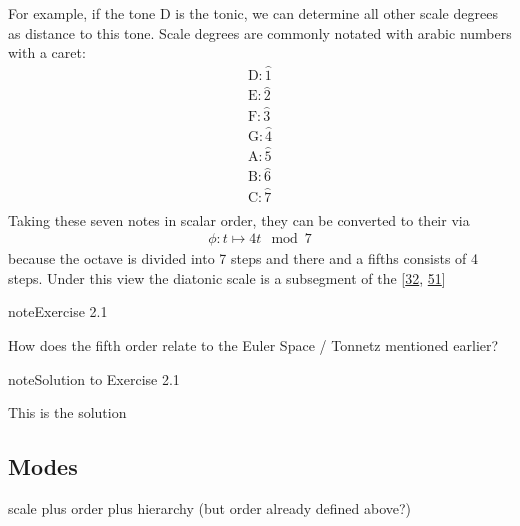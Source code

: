 \documentclass[letterpaper,10pt,english]{sphinxmanual}
\begin{document}
\sphinxAtStartPar
For example, if the tone D is the tonic, we can determine all other scale degrees
as distance to this tone. Scale degrees are commonly notated with arabic numbers with a caret:
\begin{equation*}
\begin{split}\text{D}: \hat{1}\\
\text{E}: \hat{2}\\
\text{F}: \hat{3}\\
\text{G}: \hat{4}\\
\text{A}: \hat{5}\\
\text{B}: \hat{6}\\
\text{C}: \hat{7}\\\end{split}
\end{equation*}
\sphinxAtStartPar
Taking these seven notes in scalar order, they can be converted to their  via
\begin{equation*}
\begin{split}\phi: t \mapsto 4t \mod 7\end{split}
\end{equation*}
\sphinxAtStartPar
because the octave is divided into 7 steps and there and a fifths consists of 4 steps.
Under this view the diatonic scale is a subsegment
of the  {[}\hyperlink{cite.8_bibliography:id34}{32}, \hyperlink{cite.8_bibliography:id30}{51}{]}
 \label{exercise:ex:tonnetz}

\begin{sphinxadmonition}{note}{Exercise 2.1}



\sphinxAtStartPar
How does the fifth order relate to the Euler Space / Tonnetz mentioned earlier?
\end{sphinxadmonition}
 \label{2_scales_modes:sol:tonnetz}

\begin{sphinxadmonition}{note}{Solution to Exercise 2.1}



\sphinxAtStartPar
This is the solution
\end{sphinxadmonition}


\subsection{Modes}
\label{\detokenize{2_scales_modes:modes}}
\sphinxAtStartPar
scale plus order plus hierarchy (but order already defined above?)
\end{document}
